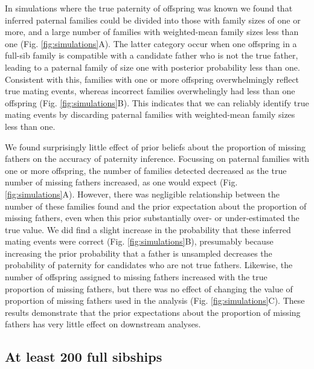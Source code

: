 \documentclass[10pt, a4paper, twocolumn]{article} %
\begin{document}
In simulations where the true paternity of offspring was known we found that inferred paternal families could be divided into those with family sizes of one or more, and a large number of families with weighted-mean family sizes less than one (Fig. \ref{fig:simulations}A).
The latter category occur when one offspring in a full-sib family is compatible with a candidate father who is not the true father, leading to a paternal family of size one with posterior probability less than one.
Consistent with this, families with one or more offspring  overwhelmingly reflect true mating events, whereas incorrect families overwhelingly had less than one offspring (Fig. \ref{fig:simulations}B).
This indicates that we can reliably identify true mating events by discarding paternal families with weighted-mean family sizes less than one.

We found surprisingly little effect of prior beliefs about the proportion of missing fathers on the accuracy of paternity inference.
Focussing on paternal families with one or more offspring, the number of families detected decreased as the true number of missing fathers increased, as one would expect (Fig. \ref{fig:simulations}A).
However, there was negligible relationship between the number of these families found and the prior expectation about the proportion of missing fathers, even when this prior substantially over- or under-estimated the true value.
We did find a slight increase in the probability that these inferred mating events were correct (Fig. \ref{fig:simulations}B), presumably because increasing the prior probability that a father is unsampled decreases the probability of paternity for candidates who are not true fathers.
Likewise, the number of offspring assigned to missing fathers increased with the true proportion of missing fathers, but there was no effect of changing the value of proportion of missing fathers used in the analysis (Fig. \ref{fig:simulations}C).
These results demonstrate that the prior expectations about the proportion of missing fathers has very little effect on downstream analyses.

\subsection{At least 200 full sibships}

\end{document}
